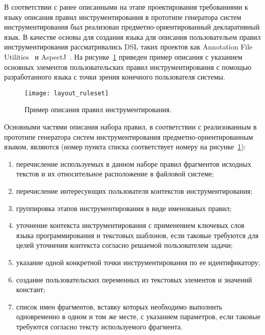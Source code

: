 В соответствии с ранее описанными на этапе проектирования требованиями к языку описания правил инструментирования в прототипе генератора систем инструментирования был реализован предметно-ориентированный декларативный язык.
В качестве основы для создания языка для описания пользовательем правил инструментирования рассматривались DSL таких проектов как Annotation File Utilities~\cite{jaif} и AspectJ~\cite{aspectj}.
На рисунке~\ref{fig:layout-ruleset} приведен пример описания с указанием основных элементов пользовательских правил инструментирования с помощью разработанного языка с точки зрения конечного пользователя системы.

\begin{figure}[!h]
  \centering
  \texttt{[image: layout\_ruleset]}
  \caption{Пример описания правил инструментирования.}
  \label{fig:layout-ruleset}
\end{figure}

Основными частями описания набора правил, в соответствии с реализованным в прототипе генератора систем инструментирования предметно-ориентированным языком, являются (номер пункта списка соответствует номеру на рисунке~\ref{fig:layout-ruleset}):
\begin{enumerate}[noitemsep]
  \item перечисление используемых в данном наборе правил фрагментов исходных текстов и их относительное расположение в файловой системе;
  \item перечисление интересующих пользователя контекстов инструментирования;
  \item группировка этапов инструментирования в виде именованых правил;
  \item уточнение контекста инструментирования с применением ключевых слов языка программирования и текстовых шаблонов, если таковые требуются для целей уточнения контекста согласно решаемой пользователем задачи;
  \item указание одной конкретной точки инструментирования по ее идентификатору;
  \item создание пользовательских переменных из текстовых элементов и значений констант;
  \item список имен фрагментов, вставку которых необходимо выполнить одновременно в одном и том же месте, с указанием параметров, если таковые требуются согласно тексту используемого фрагмента.
\end{enumerate}

